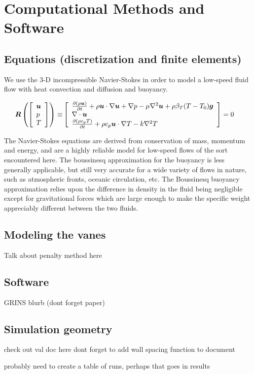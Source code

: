 \section{Computational Methods and Software}
\label{sec:method}

\subsection{Equations (discretization and finite elements)}

We use the 3-D incompressible Navier-Stokes in order to model a
low-speed fluid flow with heat convection and diffusion and buoyancy. 

\begin{align*}
    {\ensuremath{\boldsymbol{R}}}\left(\left[
    \begin{array}{l}
        {\ensuremath{\boldsymbol{u}}} \\
        p \\
        T 
    \end{array}
    \right]\right) \equiv& 
    \left[
    \begin{array}{l}
        \frac{\partial (\rho {\ensuremath{\boldsymbol{u}}})}{\partial t} + \rho {\ensuremath{\boldsymbol{u}}} \cdot
    \nabla {\ensuremath{\boldsymbol{u}}} + \nabla p - \mu \nabla^2 {\boldsymbol{u}} + 
    \rho \beta_T (T - T_0) {\boldsymbol{g}} \\
    \nabla \cdot {\ensuremath{\boldsymbol{u}}} \\
    \frac{\partial (\rho c_p T)}{\partial t} + \rho c_p {\boldsymbol{u}} \cdot
    \nabla T - k \nabla^2 T
    \end{array} 
    \right] = 0
\end{align*}

The Navier-Stokes equations are derived from conservation of mass,
momentum and energy, and are a highly reliable model for low-speed flows
of the sort encountered here. The boussinesq approximation for the
buoyancy is less generally applicable, but still very accurate for a
wide variety of flows in nature, such as atmospheric fronts, oceanic
circulation, etc. The Boussinesq buoyancy approximation relies upon the
difference in density in the fluid being negligible except for gravitational
forces which are large enough to make the specific weight appreciably different
between the two fluids.


\subsection{Modeling the vanes}

Talk about penalty method here

\subsection{Software}

GRINS blurb (dont forget paper)

\subsection{Simulation geometry}

check out val doc here
dont forget to add wall spacing function to document

probably need to create a table of runs, perhaps that goes in results
